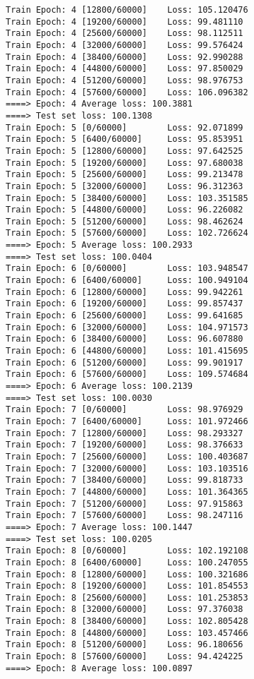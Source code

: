 \documentclass[11pt]{article}
\begin{document}
\begin{Verbatim}[commandchars=\\\{\}]
Train Epoch: 4 [12800/60000]    Loss: 105.120476
Train Epoch: 4 [19200/60000]    Loss: 99.481110
Train Epoch: 4 [25600/60000]    Loss: 98.112511
Train Epoch: 4 [32000/60000]    Loss: 99.576424
Train Epoch: 4 [38400/60000]    Loss: 92.990288
Train Epoch: 4 [44800/60000]    Loss: 97.850029
Train Epoch: 4 [51200/60000]    Loss: 98.976753
Train Epoch: 4 [57600/60000]    Loss: 106.096382
====> Epoch: 4 Average loss: 100.3881
====> Test set loss: 100.1308
Train Epoch: 5 [0/60000]        Loss: 92.071899
Train Epoch: 5 [6400/60000]     Loss: 95.853951
Train Epoch: 5 [12800/60000]    Loss: 97.642525
Train Epoch: 5 [19200/60000]    Loss: 97.680038
Train Epoch: 5 [25600/60000]    Loss: 99.213478
Train Epoch: 5 [32000/60000]    Loss: 96.312363
Train Epoch: 5 [38400/60000]    Loss: 103.351585
Train Epoch: 5 [44800/60000]    Loss: 96.226082
Train Epoch: 5 [51200/60000]    Loss: 98.462624
Train Epoch: 5 [57600/60000]    Loss: 102.726624
====> Epoch: 5 Average loss: 100.2933
====> Test set loss: 100.0404
Train Epoch: 6 [0/60000]        Loss: 103.948547
Train Epoch: 6 [6400/60000]     Loss: 100.949104
Train Epoch: 6 [12800/60000]    Loss: 99.942261
Train Epoch: 6 [19200/60000]    Loss: 99.857437
Train Epoch: 6 [25600/60000]    Loss: 99.641685
Train Epoch: 6 [32000/60000]    Loss: 104.971573
Train Epoch: 6 [38400/60000]    Loss: 96.607880
Train Epoch: 6 [44800/60000]    Loss: 101.415695
Train Epoch: 6 [51200/60000]    Loss: 99.901917
Train Epoch: 6 [57600/60000]    Loss: 109.574684
====> Epoch: 6 Average loss: 100.2139
====> Test set loss: 100.0030
Train Epoch: 7 [0/60000]        Loss: 98.976929
Train Epoch: 7 [6400/60000]     Loss: 101.972466
Train Epoch: 7 [12800/60000]    Loss: 98.293327
Train Epoch: 7 [19200/60000]    Loss: 98.376633
Train Epoch: 7 [25600/60000]    Loss: 100.403687
Train Epoch: 7 [32000/60000]    Loss: 103.103516
Train Epoch: 7 [38400/60000]    Loss: 99.818733
Train Epoch: 7 [44800/60000]    Loss: 101.364365
Train Epoch: 7 [51200/60000]    Loss: 97.915863
Train Epoch: 7 [57600/60000]    Loss: 98.247116
====> Epoch: 7 Average loss: 100.1447
====> Test set loss: 100.0205
Train Epoch: 8 [0/60000]        Loss: 102.192108
Train Epoch: 8 [6400/60000]     Loss: 100.247055
Train Epoch: 8 [12800/60000]    Loss: 100.321686
Train Epoch: 8 [19200/60000]    Loss: 101.854553
Train Epoch: 8 [25600/60000]    Loss: 101.253853
Train Epoch: 8 [32000/60000]    Loss: 97.376038
Train Epoch: 8 [38400/60000]    Loss: 102.805428
Train Epoch: 8 [44800/60000]    Loss: 103.457466
Train Epoch: 8 [51200/60000]    Loss: 96.180656
Train Epoch: 8 [57600/60000]    Loss: 94.424225
====> Epoch: 8 Average loss: 100.0897

\end{Verbatim}
\end{document}
